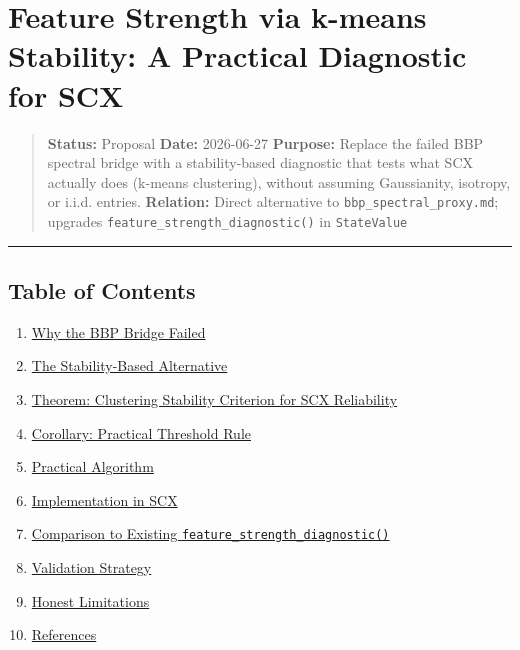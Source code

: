 \documentclass[
  12pt,
]{article}
\author{SCX}
\date{2026}
\providecommand{\tightlist}{%
  \setlength{\itemsep}{0pt}\setlength{\parskip}{0pt}}
\begin{document}
\section{Feature Strength via k-means Stability: A Practical Diagnostic
for
SCX}\label{feature-strength-via-k-means-stability-a-practical-diagnostic-for-scx}

\begin{quote}
\textbf{Status:} Proposal \textbar{} \textbf{Date:} 2026-06-27
\textbf{Purpose:} Replace the failed BBP spectral bridge with a
stability-based diagnostic that tests what SCX actually does (k-means
clustering), without assuming Gaussianity, isotropy, or i.i.d. entries.
\textbf{Relation:} Direct alternative to
\texttt{bbp\_spectral\_proxy.md}; upgrades
\texttt{feature\_strength\_diagnostic()} in \texttt{StateValue}
\end{quote}

\begin{center}\rule{0.5\linewidth}{0.5pt}\end{center}

\subsection{Table of Contents}\label{table-of-contents}

\begin{enumerate}
\def\labelenumi{\arabic{enumi}.}
\tightlist
\item
  \hyperref[1-why-the-bbp-bridge-failed]{Why the BBP Bridge Failed}
\item
  \hyperref[2-the-stability-based-alternative]{The Stability-Based
  Alternative}
\item
  \hyperref[3-theorem-clustering-stability-criterion-for-scx-reliability]{Theorem:
  Clustering Stability Criterion for SCX Reliability}
\item
  \hyperref[4-corollary-practical-threshold-rule]{Corollary: Practical
  Threshold Rule}
\item
  \hyperref[5-practical-algorithm]{Practical Algorithm}
\item
  \hyperref[6-implementation-in-scx]{Implementation in SCX}
\item
  \hyperref[7-comparison-to-existing-feature_strength_diagnostic]{Comparison
  to Existing \texttt{feature\_strength\_diagnostic()}}
\item
  \hyperref[8-validation-strategy]{Validation Strategy}
\item
  \hyperref[9-honest-limitations]{Honest Limitations}
\item
  \hyperref[10-references]{References}
\end{enumerate}
\end{document}
